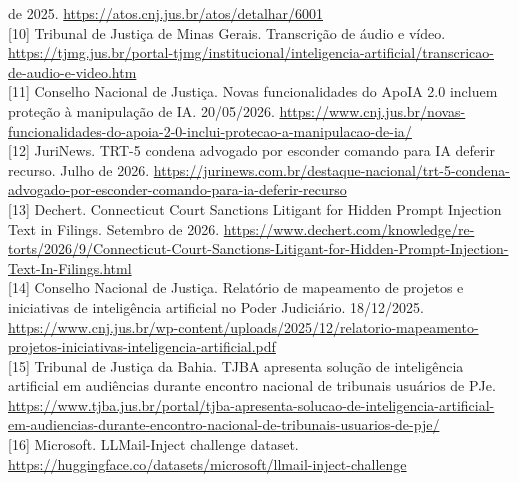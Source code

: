 \documentclass[
  brazilian,
  11pt,
]{article}
\begin{document}
de 2025. \url{https://atos.cnj.jus.br/atos/detalhar/6001}\\
{[}10{]} Tribunal de Justiça de Minas Gerais. Transcrição de áudio e
vídeo.
\url{https://tjmg.jus.br/portal-tjmg/institucional/inteligencia-artificial/transcricao-de-audio-e-video.htm}\\
{[}11{]} Conselho Nacional de Justiça. Novas funcionalidades do ApoIA
2.0 incluem proteção à manipulação de IA. 20/05/2026.
\url{https://www.cnj.jus.br/novas-funcionalidades-do-apoia-2-0-inclui-protecao-a-manipulacao-de-ia/}\\
{[}12{]} JuriNews. TRT-5 condena advogado por esconder comando para IA
deferir recurso. Julho de 2026.
\url{https://jurinews.com.br/destaque-nacional/trt-5-condena-advogado-por-esconder-comando-para-ia-deferir-recurso}\\
{[}13{]} Dechert. Connecticut Court Sanctions Litigant for Hidden Prompt
Injection Text in Filings. Setembro de 2026.
\url{https://www.dechert.com/knowledge/re-torts/2026/9/Connecticut-Court-Sanctions-Litigant-for-Hidden-Prompt-Injection-Text-In-Filings.html}\\
{[}14{]} Conselho Nacional de Justiça. Relatório de mapeamento de
projetos e iniciativas de inteligência artificial no Poder Judiciário.
18/12/2025.
\url{https://www.cnj.jus.br/wp-content/uploads/2025/12/relatorio-mapeamento-projetos-iniciativas-inteligencia-artificial.pdf}\\
{[}15{]} Tribunal de Justiça da Bahia. TJBA apresenta solução de
inteligência artificial em audiências durante encontro nacional de
tribunais usuários de PJe.
\url{https://www.tjba.jus.br/portal/tjba-apresenta-solucao-de-inteligencia-artificial-em-audiencias-durante-encontro-nacional-de-tribunais-usuarios-de-pje/}\\
{[}16{]} Microsoft. LLMail-Inject challenge dataset.
\url{https://huggingface.co/datasets/microsoft/llmail-inject-challenge}\\
\end{document}
